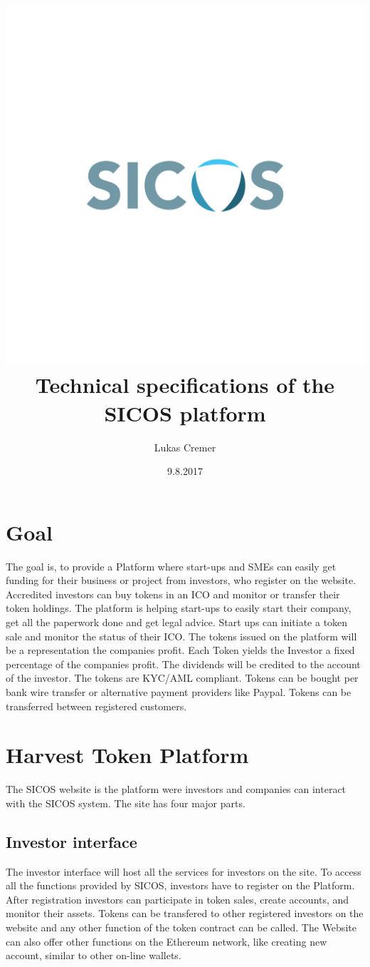 \documentclass[11pt]{article}
\title
{
  \includegraphics[scale=0.17]{sicos-logo2}      
  Technical specifications   
  of the SICOS platform
      }
\author{Lukas Cremer}
\date{9.8.2017}
\begin{document}
\maketitle
\newpage
\section{Goal}
The goal is, to provide a Platform where start-ups and SMEs can easily get funding for their business or project from investors, who register on the website. Accredited investors can buy tokens in an ICO and monitor or transfer their token holdings. 
The platform is helping start-ups to easily start their company, get all the paperwork done and get legal advice.  Start ups can initiate a token sale and monitor the status of their ICO.
The tokens issued on the platform will be a representation the companies profit. Each Token yields the Investor a fixed percentage of the companies profit. The dividends will be credited to the account of the investor. The tokens are KYC/AML compliant. Tokens can be bought  per bank wire transfer or alternative payment providers like Paypal. Tokens can be transferred between registered customers.  

\section{Harvest Token Platform}

The SICOS website is the platform were investors and companies can interact with the SICOS system. The site has four major parts. 
\subsection{Investor interface}
The investor interface will host all the services for investors on the site. To access all the functions provided by SICOS, investors have to register on the Platform. After registration investors can participate in token sales, create accounts, and monitor their assets. Tokens can be transfered to other registered investors on the website and any other function of the token contract can be called. The Website can also offer other functions on the Ethereum network, like creating new account, similar to other on-line wallets.
\end{document}
